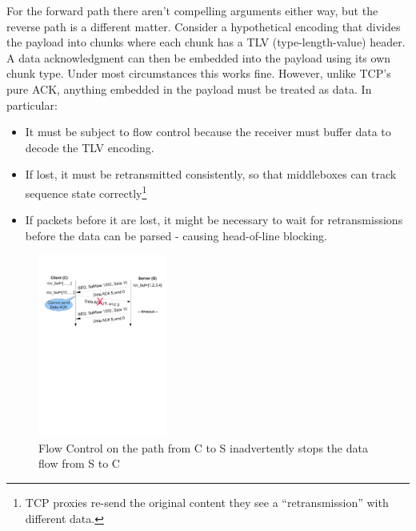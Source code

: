For the forward path there aren't compelling arguments either
way, but the reverse path is a different matter.
Consider a hypothetical encoding that divides the payload into chunks
where each chunk has a TLV (type-length-value) header.  A data acknowledgment can then be
embedded into the payload using its own chunk type.  Under most
circumstances this works fine.  However, unlike TCP's pure ACK, anything
embedded in the payload must be treated as data.  In particular:
\begin{itemize}
\item It must be subject to flow control because the receiver must
  buffer data to decode the TLV encoding.

\item If lost, it must be retransmitted consistently, so that
  middleboxes can track sequence state correctly\footnote{TCP proxies re-send the original
    content they see a ``retransmission'' with different data. }
\item If packets before it are lost, it might be necessary to wait for retransmissions
  before the data can be parsed - causing head-of-line blocking. 
\end{itemize}


\begin{figure}[t]
\centering
\includegraphics[trim=1cm 17cm 1cm 1cm,clip=true,height=6cm]{figures/dataack_deadlock}
\caption{Flow Control on the path from C to S inadvertently stops the data flow from S to C}
\label{fig:dack_deadlock}
\end{figure}

